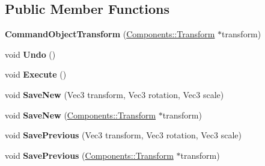 \subsection*{Public Member Functions}
\begin{DoxyCompactItemize}
\item 
\hypertarget{classDCEngine_1_1CommandObjectTransform_af959e028016151f95d9e9c57dc26b437}{{\bfseries Command\-Object\-Transform} (\hyperlink{classDCEngine_1_1Components_1_1Transform}{Components\-::\-Transform} $\ast$transform)}\label{classDCEngine_1_1CommandObjectTransform_af959e028016151f95d9e9c57dc26b437}

\item 
\hypertarget{classDCEngine_1_1CommandObjectTransform_aa6578d45b3faf5cf8febeafcbf9af34f}{void {\bfseries Undo} ()}\label{classDCEngine_1_1CommandObjectTransform_aa6578d45b3faf5cf8febeafcbf9af34f}

\item 
\hypertarget{classDCEngine_1_1CommandObjectTransform_a97e768b53e6c225cac9e7820d196e10a}{void {\bfseries Execute} ()}\label{classDCEngine_1_1CommandObjectTransform_a97e768b53e6c225cac9e7820d196e10a}

\item 
\hypertarget{classDCEngine_1_1CommandObjectTransform_a274534c28f4f8a7a582860661096ba36}{void {\bfseries Save\-New} (Vec3 transform, Vec3 rotation, Vec3 scale)}\label{classDCEngine_1_1CommandObjectTransform_a274534c28f4f8a7a582860661096ba36}

\item 
\hypertarget{classDCEngine_1_1CommandObjectTransform_af869fe894d9b187617fc5f038806b16d}{void {\bfseries Save\-New} (\hyperlink{classDCEngine_1_1Components_1_1Transform}{Components\-::\-Transform} $\ast$transform)}\label{classDCEngine_1_1CommandObjectTransform_af869fe894d9b187617fc5f038806b16d}

\item 
\hypertarget{classDCEngine_1_1CommandObjectTransform_a422a74fcb39a80c039c851022c2b6ece}{void {\bfseries Save\-Previous} (Vec3 transform, Vec3 rotation, Vec3 scale)}\label{classDCEngine_1_1CommandObjectTransform_a422a74fcb39a80c039c851022c2b6ece}

\item 
\hypertarget{classDCEngine_1_1CommandObjectTransform_a6437a76ac47560d2d2ac4d4ea2e09b24}{void {\bfseries Save\-Previous} (\hyperlink{classDCEngine_1_1Components_1_1Transform}{Components\-::\-Transform} $\ast$transform)}\label{classDCEngine_1_1CommandObjectTransform_a6437a76ac47560d2d2ac4d4ea2e09b24}

\end{DoxyCompactItemize}
